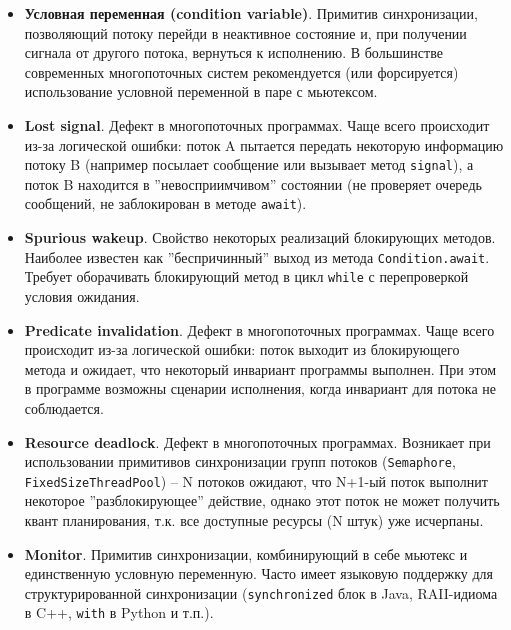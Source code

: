 \documentclass[a4paper, 12pt]{extarticle}
\begin{document}
\begin{itemize}
	\item \textbf{Условная переменная (condition variable)}. Примитив синхронизации, позволяющий потоку перейди в неактивное состояние и, при получении сигнала от другого потока, вернуться к исполнению. В большинстве современных многопоточных систем рекомендуется (или форсируется) использование условной переменной в паре с мьютексом.

	\item \textbf{Lost signal}. Дефект в многопоточных программах. Чаще всего происходит из-за логической ошибки: поток A пытается передать некоторую информацию потоку B (например посылает сообщение или вызывает метод \texttt{signal}), а поток B находится в ''невосприимчивом'' состоянии (не проверяет очередь сообщений, не заблокирован в методе \texttt{await}).

	\item \textbf{Spurious wakeup}. Свойство некоторых реализаций блокирующих методов. Наиболее известен как ''беспричинный'' выход из метода \texttt{Condition.await}. Требует оборачивать блокирующий метод в цикл \texttt{while} с перепроверкой условия ожидания.

	\item \textbf{Predicate invalidation}. Дефект в многопоточных программах. Чаще всего происходит из-за логической ошибки: поток выходит из блокирующего метода и ожидает, что некоторый инвариант программы выполнен. При этом в программе возможны сценарии исполнения, когда инвариант для потока не соблюдается.


	\item \textbf{Resource deadlock}. Дефект в многопоточных программах. Возникает при использовании примитивов синхронизации групп потоков (\texttt{Semaphore}, \texttt{FixedSizeThreadPool}) -- N потоков ожидают, что N+1-ый поток выполнит некоторое ''разблокирующее'' действие, однако этот поток не может получить квант планирования, т.к. все доступные ресурсы (N штук) уже исчерпаны.

	\item \textbf{Monitor}. Примитив синхронизации, комбинирующий в себе мьютекс и единственную условную переменную. Часто имеет языковую поддержку для структурированной синхронизации (\texttt{synchronized} блок в Java, RAII-идиома в C++, \texttt{with} в Python и т.п.).	


\end{itemize}
\end{document}
